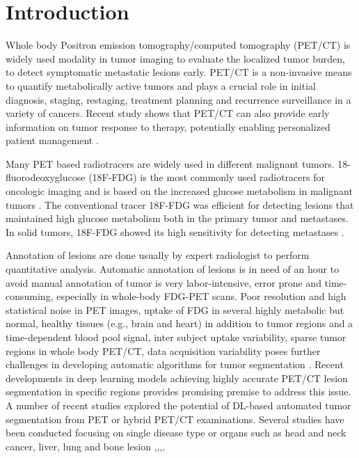 \documentclass[runningheads]{llncs}
\begin{document}
\section{Introduction}
Whole body Positron emission tomography/computed tomography (PET/CT) is widely used modality in tumor imaging to evaluate the localized tumor burden, to detect symptomatic metastatic lesions early. PET/CT is a non-invasive means to quantify metabolically active tumors and plays a crucial role in initial diagnosis, staging, restaging, treatment planning and recurrence surveillance in a variety of cancers. Recent study shows that PET/CT can also provide early information on tumor response to therapy, potentially enabling personalized patient management \cite{ben200918f}.

Many PET based radiotracers are widely used in different malignant tumors. 18-fluorodeoxyglucose (18F-FDG) is the most commonly used radiotracers for oncologic imaging and is based on the increased glucose metabolism in malignant tumors \cite{shen2021evolving}\cite{jadvar2015positron}.  The conventional tracer 18F-FDG was efficient for detecting lesions that maintained high glucose metabolism both in the primary tumor and metastases. In solid tumors, 18F-FDG showed its high sensitivity for detecting metastases \cite{evangelista2020re}.

Annotation of lesions are done usually by expert radiologist to perform quantitative analysis. Automatic annotation of lesions is in need of an hour to avoid manual annotation of tumor is very labor-intensive, error prone and time-consuming, especially in whole-body FDG-PET scans.  Poor resolution and high statistical noise in PET images, uptake of FDG in several highly metabolic but normal, healthy tissues (e.g., brain and heart) in addition to tumor regions and a time-dependent blood pool signal, inter subject uptake variability, sparse tumor regions in whole body PET/CT, data acquisition variability poses further challenges in developing automatic algorithms for tumor segmentation \cite{jemaa2020tumor} \cite{arabi2021promise}. Recent developments in deep learning models achieving highly accurate PET/CT lesion segmentation in specific regions provides promising premise to address this issue.  A number of recent studies explored the potential of DL-based automated tumor segmentation from PET or hybrid PET/CT examinations. Several studies have been conducted focusing on single disease type or organs such as head and neck cancer, liver, lung and bone lesion \cite{xue2021multi},\cite{moreau2020deep},\cite{protonotarios2022few},\cite{murugesan2021head}.
\end{document}
